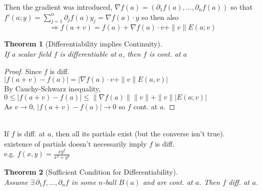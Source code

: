 \documentclass[twoside]{amsart}
\theoremstyle{plain}
\newtheorem{theorem}{Theorem}
\theoremstyle{definition}
\begin{document}
Then the gradient was introduced, $\nabla f(a) = (\partial_1 f(a), \dots, \partial_n f(a) )$ so that \\
$f'(a;y) = \sum_{j=1}^n \partial_j f(a) y_j =\nabla f(a) \cdot y $  so then also
\[
\Longrightarrow f(a+v) = f(a) + \nabla f(a) \cdot v + \| v \| E(a;v)
\]

\begin{theorem}[Differentiability implies Continuity] \quad \\
If a scalar field $f$ is differentiable at $a$, then $f$ is cont. at $a$
\end{theorem}

\begin{proof}
  Since $f$ is diff. \\
$|f(a+v) -f(a)| = |\nabla f(a) \cdot v + \| v \| E(a,v) | $\\
By Cauchy-Schwarz inequality, \medskip \\
$0\leq | f(a+v) -f(a) | \leq \| \nabla f(a) \| \| v \| + \| v \| |E(a;v) |$ \medskip \\
As $v\to 0$, $|f(a+v) - f(a)| \to 0$ so $f$ cont. at $a$.  
\end{proof}

\quad \bigskip \\
If $f$ is diff. at $a$, then all its partials exist (but the converse isn't true).  \\
\phantom{If} existence of partials doesn't necessarily imply $f$ is diff. \\
e.g. $f(x,y) = \frac{ xy^2}{ x^2 + y^4}$ \quad \bigskip \\

\begin{theorem}[Sufficient Condition for Differentiability] \quad \\
Assume $\exists \, \partial_1 f , \dots , \partial_n f$ in some $n$-ball $B(a)$ and are cont. at $a$.  Then $f$ diff. at $a$.  
\end{theorem}
\end{document}
